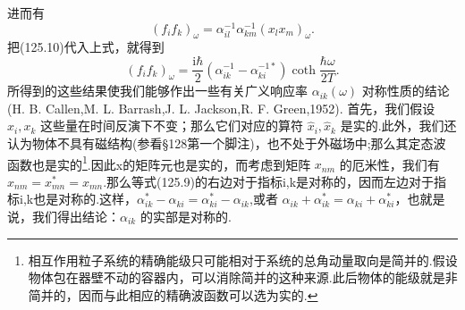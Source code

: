 进而有
\begin{equation*}
  (f_if_k)_\omega=\alpha^{-1}_{il}\alpha^{-1}_{km}(x_lx_m)_\omega.
\end{equation*}
把(125.10)代入上式，就得到
\begin{equation}
  (f_if_k)_\omega=\frac{\mathrm{i}\hbar}{2}
  (\alpha^{-1}_{ik}-\alpha^{-1*}_{ki})\coth\frac{\hbar\omega}{2T}.
\end{equation}
所得到的这些结果使我们能够作出一些有关广义响应率 $\alpha_{ik}(\omega)$ 对称性质的结论(H. B. Callen,M. L. Barrash,J. L. Jackson,R. F. Green,1952). 首先，我们假设 $x_i, x_k$ 这些量在时间反演下不变；那么它们对应的算符 $\hat{x}_i, \hat{x}_k$ 是实的.此外，我们还认为物体不具有磁结构(参看§128第一个脚注)，也不处于外磁场中;那么其定态波函数也是实的\footnote{相互作用粒子系统的精确能级只可能相对于系统的总角动量取向是简并的.假设物体包在器壁不动的容器内，可以消除简并的这种来源.此后物体的能级就是非简并的，因而与此相应的精确波函数可以选为实的.}.因此x的矩阵元也是实的，而考虑到矩阵 $x_{nm}$ 的厄米性，我们有 $x_{nm}=x_{mn}^*=x_{mn}$.那么等式(125.9)的右边对于指标i,k是对称的，因而左边对于指标i,k也是对称的.这样，$\alpha_{ik}^*-\alpha_{ki}=\alpha_{ki}^*-\alpha_{ik}$,或者 $\alpha_{ik}+\alpha_{ik}^*=\alpha_{ki}+\alpha_{ki}^*$，也就是说，我们得出结论：$\alpha_{ik}$ 的实部是对称的.

